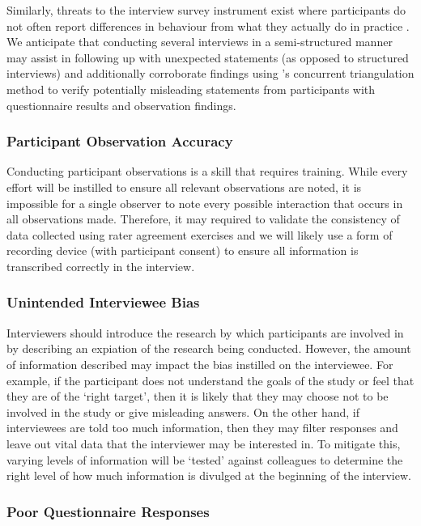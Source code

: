 Similarly, threats to the interview survey instrument exist where participants do not often report differences in behaviour from what they actually do in practice \citep{Singer:2007tu}. We anticipate that conducting several interviews in a semi-structured manner may assist in following up with unexpected statements (as opposed to structured interviews) and additionally corroborate findings using \citeauthor{Jick:1979el}'s concurrent triangulation method \citep{Jick:1979el} to verify potentially misleading statements from participants with questionnaire results and observation findings.

\subsubsection{Participant Observation Accuracy}

Conducting participant observations is a skill that requires training. While every effort will be instilled to ensure all relevant observations are noted, it is impossible for a single observer to note every possible interaction that occurs in all observations made. Therefore, it may required to validate the consistency of data collected using rater agreement exercises  and we will likely use a form of recording device (with participant consent) to ensure all information is transcribed correctly in the interview.

\subsubsection{Unintended Interviewee Bias}

Interviewers should introduce the research by which participants are involved in by describing an expiation of the research being conducted. However, the amount of information described may impact the bias instilled on the interviewee. For example, if the participant does not understand the goals of the study or feel that they are of the `right target', then it is likely that they may choose not to be involved in the study or give misleading answers. On the other hand, if interviewees are told too much information, then they may filter responses and leave out vital data that the interviewer may be interested in. To mitigate this, varying levels of information will be `tested' against colleagues to determine the right level of how much information is divulged at the beginning of the interview.

\subsubsection{Poor Questionnaire Responses}

